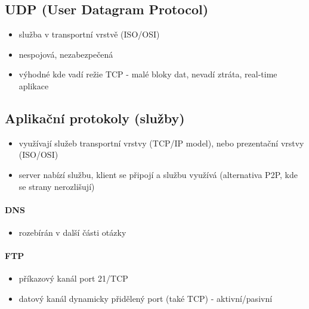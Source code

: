 \documentclass{szzclass}
\providecommand{\tightlist}{%
  \setlength{\itemsep}{0pt}\setlength{\parskip}{0pt}}
\begin{document}
\hypertarget{udp-user-datagram-protocol}{%
\subsection{UDP (User Datagram
Protocol)}\label{udp-user-datagram-protocol}}

\begin{itemize}
\tightlist
\item
  služba v transportní vrstvě (ISO/OSI)
\item
  nespojová, nezabezpečená
\item
  výhodné kde vadí režie TCP - malé bloky dat, nevadí ztráta, real-time
  aplikace
\end{itemize}

\hypertarget{aplikaux10dnuxed-protokoly-sluux17eby}{%
\subsection{Aplikační protokoly
(služby)}\label{aplikaux10dnuxed-protokoly-sluux17eby}}

\begin{itemize}
\tightlist
\item
  využívají služeb transportní vrstvy (TCP/IP model), nebo prezentační
  vrstvy (ISO/OSI)
\item
  server nabízí službu, klient se připojí a službu využívá (alternativa
  P2P, kde se strany nerozlišují)
\end{itemize}

\hypertarget{dns}{%
\paragraph{DNS}\label{dns}}

\begin{itemize}
\tightlist
\item
  rozebírán v další části otázky
\end{itemize}

\hypertarget{ftp}{%
\paragraph{FTP}\label{ftp}}

\begin{itemize}
\tightlist
\item
  příkazový kanál port 21/TCP
\item
  datový kanál dynamicky přidělený port (také TCP) - aktivní/pasivní
\end{itemize}
\end{document}

